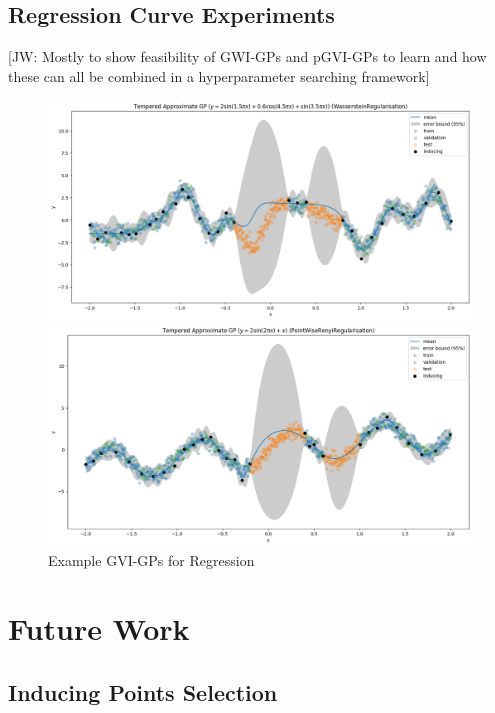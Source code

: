 \documentclass{article}
\newcommand{\jw}[1]{{\color{gray} [JW: #1]}}
\numberwithin{equation}{section}
\begin{document}
\subsection{Regression Curve Experiments}
\jw{Mostly to show feasibility of GWI-GPs and pGVI-GPs to learn and how these can all be combined in a hyperparameter searching framework}
\begin{figure}[h!]
\centering
\begin{minipage}{.5\textwidth}
  \centering
  \includegraphics[width=0.9\linewidth]{experiments/regression/toy_curves/outputs/curve3/tempered-WassersteinRegularisation.png}
\end{minipage}%
\begin{minipage}{.5\textwidth}
  \centering
  \includegraphics[width=0.9\linewidth]{experiments/regression/toy_curves/outputs/curve4/tempered-PointWiseRenyiRegularisation.png}
\end{minipage}
\caption{Example GVI-GPs for Regression}
\end{figure}

\newpage
\section{Future Work}

\subsection{Inducing Points Selection}
\end{document}
